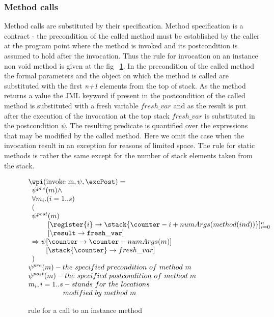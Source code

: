 \subsubsection{Method calls}
Method calls are substituted by their specification. Method specification is a contract - the precondition of the called method
must be established by the caller at the program point where the method is invoked and its postcondition is assumed to hold after the invocation. Thus the rule for
invocation on an instance non void method is given at the fig ~\ref{wpInv}. In the precondition of the called method the formal parameters and the object on which the method is called are substituted with the first \textit{n+1} elements from the top of stack. As the method returns a value the JML keyword 
 if present in the postcondition of the called method is substituted with a fresh variable $fresh\_var$ and as the result is put after the execution of the invocation at the top stack $fresh\_var$ is substituted in the postcondition $\psi$. The resulting predicate is quantified over the 
expressions that may be modified by the called method. Here we omit the case when the invocation result in an exception for reasons of limited space. 
The rule for static methods is rather the same except for the number of stack elements taken from the stack.  

\begin{figure}[!ht]
$$
\begin{array}{l}
\wpi(\rm{invoke} \ m, \psi ,\excPost) =\\ 
\begin{array}{l}
\psi^{pre}(m) \wedge \\
 \forall m_{i}. ( i = 1 .. s ) \\
 ( \\
\psi^{post}(m) \\
\phantom{\psi^{post}}[\register{i}  \rightarrow \stack{\counter - i + numArgs(method(ind) ) } ]_{i=0}^n  \\
\phantom{\psi^{post}} [\tt{\backslash result} \rightarrow fresh\_var] \\
\Rightarrow \psi[\counter \rightarrow \counter - numArgs(m)]\\
\phantom{\Rightarrow \psi} [\stack{\counter }  \rightarrow fresh\_var] \\
) \\
\end{array} \\
\psi^{pre}(m) - the \ specified \ precondition \ of \ method \ m \\
\psi^{post}(m) - the \ specified \ postcondition \ of \ method \ m \\
m_{i} , i = 1 .. s - stands  \ for \ the \ locations \\
\phantom{m_{i} , i = 1 .. s   } modified \ by \ method \ m
\end{array}
$$
\caption{\wpi \ rule for a call to an instance method}
\label{wpInv}
\end{figure}
